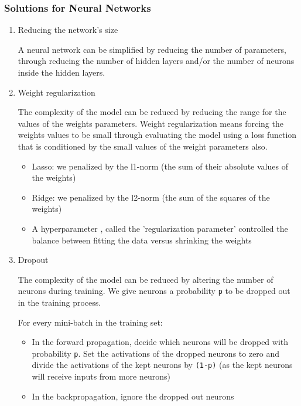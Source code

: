 \documentclass[a4paper,10pt]{article}
\begin{document}
 \subsubsection{Solutions for Neural Networks}
 \begin{enumerate}
 	\item Reducing the network's size
 	
 	\quad A neural network can be simplified by reducing the number of parameters, through reducing the number of hidden layers and/or the number of neurons inside the hidden layers.
 	
 	\item Weight regularization
 	
 	\quad The complexity of the model can be reduced by reducing the range for the values of the weights parameters. Weight regularization means forcing the weights values to be small through evaluating the model using a loss function that is conditioned by the small values of the weight parameters also. 
 	\begin{itemize}
 		\item Lasso: we penalized by the l1-norm (the sum of their absolute values of the weights)
 		\item Ridge: we penalized by the l2-norm (the sum of the squares of the weights)
 		\item A hyperparameter , called the 'regularization parameter' controlled the balance between fitting the data versus shrinking the weights 
 	\end{itemize}
 	
 	\item Dropout
 	
 	\quad The complexity of the model can be reduced by altering the number of neurons during training. We give neurons a probability \texttt{p} to be dropped out in the training process.
 	
 	
 	\quad For every mini-batch in the training set:
 	\begin{itemize}	
 	\item In the forward propagation, decide which neurons will be dropped with probability  \texttt{p}.
 	Set the activations of the dropped neurons to zero
 	and divide the activations of the kept neurons by  \texttt{(1-p)} (as the kept neurons will receive inputs from more neurons)
 	\item In the backpropagation, ignore the dropped out neurons
 	\end{itemize}
 	
 \end{enumerate}
\end{document}
